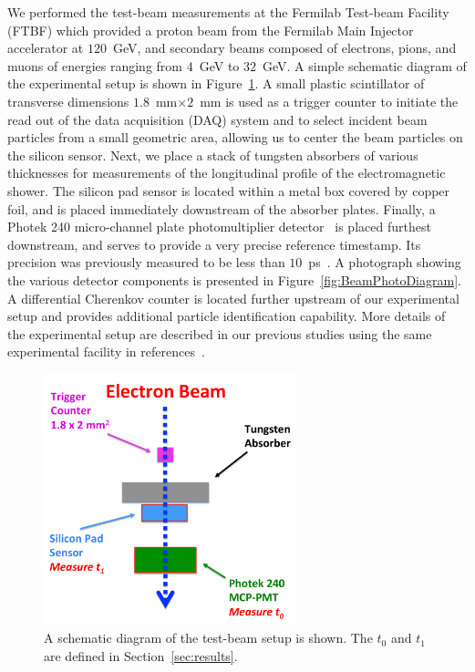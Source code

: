 \documentclass[12pt]{article}
\begin{document}
{We performed the test-beam measurements at the Fermilab Test-beam Facility
(FTBF) which provided a proton beam from the Fermilab Main Injector accelerator
at $120$~GeV, and secondary beams composed of electrons, pions, and muons of
energies ranging from $4$~GeV to $32$~GeV. A simple schematic diagram of the
experimental setup is shown in Figure~\ref{fig:BeamSchematicDiagram}. A small
plastic scintillator of transverse dimensions $1.8$~mm$\times 2$~mm is used as a
trigger counter to initiate the read out of the data acquisition (DAQ) system
and to select incident beam particles from a small geometric area, allowing us to center the 
beam particles on the silicon sensor. Next, we place a stack of tungsten absorbers of various thicknesses for
measurements of the longitudinal profile of the electromagnetic shower. The
silicon pad sensor is located within a metal box covered by copper foil, and is
placed immediately downstream of the absorber plates. Finally, a Photek 240
micro-channel plate photomultiplier detector~\cite{Anderson:2015gha,
MCPFastCaloNIMA, Ronzhin2015288,Ronzhin201552} is placed furthest downstream,
and serves to provide a very precise reference timestamp. Its precision was
previously measured to be less than $10$~ps~\cite{MCPShowerMaxPaper}. 
A photograph showing the various
detector components is presented in Figure~\ref{fig:BeamPhotoDiagram}. A
differential Cherenkov counter is located further upstream of our experimental
setup and provides additional particle identification capability. More
details of the experimental setup are described in our previous studies using
the same experimental facility in references~\cite{Anderson:2015gha,
MCPFastCaloNIMA, Ronzhin2015288,Ronzhin201552}.

\begin{figure}[htbp] 
\centering
\includegraphics[width=0.65\textwidth]{plots/BeamSchematicDiagram.pdf} 
\caption{A schematic diagram of the test-beam setup is shown. The $t_0$ and $t_1$ are defined in Section~\ref{sec:results}.} 
\label{fig:BeamSchematicDiagram} 
\end{figure} 

}
\end{document}
